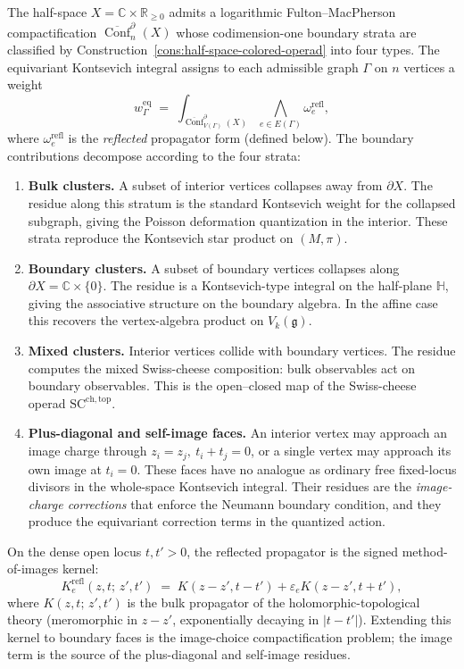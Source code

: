 \begin{construction}%
\label{cons:equivariant-kontsevich-integral}
The half-space $X = \mathbb C\times\mathbb R_{\ge 0}$ admits a logarithmic
Fulton--MacPherson compactification
$\overline{\operatorname{Conf}}_n^{\partial}(X)$ whose codimension-one boundary
strata are classified by Construction~\ref{cons:half-space-colored-operad} into
four types. The equivariant Kontsevich integral assigns to each admissible
graph $\Gamma$ on $n$ vertices a weight
\[
w_\Gamma^{\mathrm{eq}}
\;=\;
\int_{\overline{\operatorname{Conf}}^{\partial}_{V(\Gamma)}(X)}
\bigwedge_{e\in E(\Gamma)} \omega_e^{\mathrm{refl}},
\]
where $\omega_e^{\mathrm{refl}}$ is the \emph{reflected} propagator form
(defined below). The boundary contributions decompose according to the four
strata:

\begin{enumerate}
\item \textbf{Bulk clusters.} A subset of interior vertices collapses away from
$\partial X$. The residue along this stratum is the standard Kontsevich weight
for the collapsed subgraph, giving the Poisson deformation quantization in the
interior. These strata reproduce the Kontsevich star product on
$(M,\pi)$.

\item \textbf{Boundary clusters.} A subset of boundary vertices collapses along
$\partial X = \mathbb C\times\{0\}$. The residue is a Kontsevich-type integral
on the half-plane $\mathbb H$, giving the associative structure on the boundary
algebra. In the affine case this recovers the vertex-algebra product on
$V_k(\mathfrak g)$.

\item \textbf{Mixed clusters.} Interior vertices collide with boundary vertices.
The residue computes the mixed Swiss-cheese composition:
bulk observables act on boundary observables. This is the open--closed map
of the Swiss-cheese operad $\mathrm{SC}^{\mathrm{ch,top}}$.

\item \textbf{Plus-diagonal and self-image faces.} An interior vertex
may approach an image charge through $z_i=z_j,\ t_i+t_j=0$, or a
single vertex may approach its own image at $t_i=0$. These faces have
no analogue as ordinary free fixed-locus divisors in the whole-space
Kontsevich integral. Their residues are the \emph{image-charge
corrections} that enforce the Neumann boundary condition, and they
produce the equivariant correction terms in the quantized action.
\end{enumerate}

On the dense open locus $t,t'>0$, the reflected propagator is the
signed method-of-images kernel:
\[
K^{\mathrm{refl}}_e(z,t;\,z',t')
\;=\;
K(z-z',t-t')+\varepsilon_e K(z-z',t+t'),
\]
where $K(z,t;\,z',t')$ is the bulk propagator of the
holomorphic-topological theory (meromorphic in $z-z'$, exponentially
decaying in $|t-t'|$). Extending this kernel to boundary faces is the
image-choice compactification problem; the image term is the source of
the plus-diagonal and self-image residues.
\end{construction}

